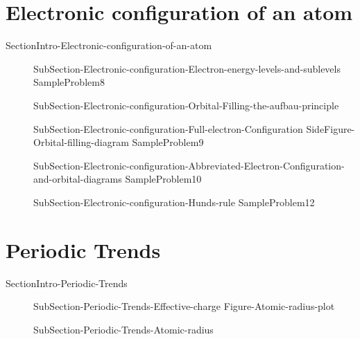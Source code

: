 \documentclass[main.tex]{subfiles}
\newcommand\chapterlabel{Ch-Table}\setcounter{figurenewcounter}{0}\setcounter{tablenewcounter}{0}\setcounter{formulanewcounter}{0}\chapterpicture{../{\chapterlabel}/figure1}\chapterpicturelabel{PxFuel}
\begin{document}
{\section{Electronic configuration of an atom}{SectionIntro-Electronic-configuration-of-an-atom}
\sloppy\begin{description}
\item[] {SubSection-Electronic-configuration-Electron-energy-levels-and-sublevels}
{SampleProblem8}
     \label{Fig:{\chapterlabel}\thefigurenewcounter} 
\item[]{SubSection-Electronic-configuration-Orbital-Filling-the-aufbau-principle}
\item[] {SubSection-Electronic-configuration-Full-electron-Configuration}
{SideFigure-Orbital-filling-diagram}
{SampleProblem9}
\item[] {SubSection-Electronic-configuration-Abbreviated-Electron-Configuration-and-orbital-diagrams}
{SampleProblem10}
\item[] {SubSection-Electronic-configuration-Hunds-rule}
{SampleProblem12}
\end{description}



\section{Periodic Trends}{SectionIntro-Periodic-Trends}
\vspace{0cm}{Figure-Atomic-radius}
\sloppy\begin{description}
\item[] {SubSection-Periodic-Trends-Effective-charge}
{Figure-Atomic-radius-plot}
\item[] {SubSection-Periodic-Trends-Atomic-radius}
\newpage\hspace{10cm}{Table-Ionization-energies}


\end{description}}
\end{document}
